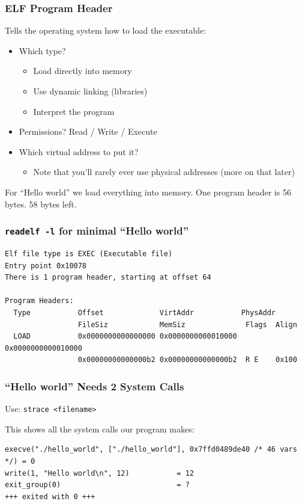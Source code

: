 \documentclass[aspectratio=169]{beamer}
\begin{document}
  \begin{frame}
    \frametitle{ELF Program Header}

    Tells the operating system how to load the executable:

    \begin{itemize}
      \item Which type?
        \begin{itemize}
          \item Load directly into memory
          \item Use dynamic linking (libraries)
          \item Interpret the program
        \end{itemize}
      \item Permissions? Read / Write / Execute
      \item Which virtual address to put it?
        \begin{itemize}
          \item Note that you'll rarely ever use physical addresses (more on
                that later)
        \end{itemize}
    \end{itemize}

    \vspace{2em}

    For ``Hello world'' we load everything into memory. One program header is 56
    bytes. 58 bytes left.
  \end{frame}

  \begin{frame}[fragile]
    \frametitle{\texttt{readelf -l} for minimal ``Hello world''}

    \begin{lstlisting}[basicstyle=\small\ttfamily]
Elf file type is EXEC (Executable file)
Entry point 0x10078
There is 1 program header, starting at offset 64

Program Headers:
  Type           Offset             VirtAddr           PhysAddr
                 FileSiz            MemSiz              Flags  Align
  LOAD           0x0000000000000000 0x0000000000010000 0x0000000000010000
                 0x00000000000000b2 0x00000000000000b2  R E    0x100
    \end{lstlisting}
  \end{frame}

  \begin{frame}[fragile]
    \frametitle{``Hello world'' Needs 2 System Calls}

    Use: \hspace{0.5em} \texttt{strace <filename>}

    \vspace{1em}
    
    This shows all the system calls our program makes:

    \begin{lstlisting}[basicstyle=\small\ttfamily]
execve("./hello_world", ["./hello_world"], 0x7ffd0489de40 /* 46 vars */) = 0
write(1, "Hello world\n", 12)           = 12
exit_group(0)                           = ?
+++ exited with 0 +++
    \end{lstlisting}
  \end{frame}
\end{document}
